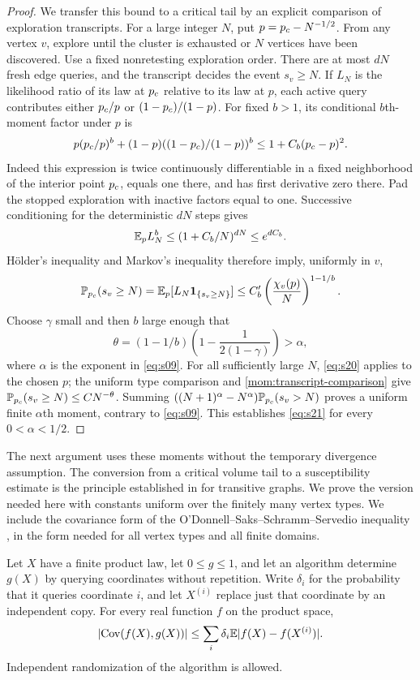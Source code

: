 \begin{proof}
We transfer this bound to a critical tail by an explicit comparison
of exploration transcripts.  For a large integer $N$, put
$p={p_c}-N^{-1/2}$.  From any vertex $v$, explore until the cluster
is exhausted or $N$ vertices have been discovered.  Use a fixed
nonretesting exploration order.  There are at most $dN$ fresh edge
queries, and the transcript decides the event $s_v\ge N$.
If $L_N$ is the likelihood ratio of its law at ${p_c}$ relative to
its law at $p$, each active query contributes either ${p_c}/p$ or
$(1-{p_c})/(1-p)$.  For fixed $b>1$, its conditional $b$th-moment
factor under $p$ is
\[
 p({p_c}/p)^b+(1-p)((1-{p_c})/(1-p))^b
       \le 1+C_b({p_c}-p)^2.
\]
Indeed this expression is twice continuously differentiable in a
fixed neighborhood of the interior point ${p_c}$, equals one there,
and has first derivative zero there.  Pad the stopped exploration
with inactive factors equal to one.  Successive conditioning for
the deterministic $dN$ steps gives
\[
 \mathbb E_p L_N^b\le(1+C_b/N)^{dN}\le e^{dC_b}.
\]
H\"older's inequality and Markov's inequality therefore imply,
uniformly in $v$,
\begin{equation}
 \mathbb P_{{p_c}}(s_v\ge N)
 =\mathbb E_p[L_N\mathbf 1_{\{s_v\ge N\}}]
 \le C_b'\left(\frac{\chi_v(p)}{N}\right)^{1-1/b}.
 \label{mom:transcript-comparison}
\end{equation}
Choose $\gamma$ small and then $b$ large enough that
\[
 \theta=(1-1/b)\left(1-\frac1{2(1-\gamma)}\right)>\alpha,
\]
where $\alpha$ is the exponent in \eqref{eq:s09}.  For all
sufficiently large $N$, \eqref{eq:s20} applies to the chosen $p$;
the uniform type comparison and
\eqref{mom:transcript-comparison} give
$\mathbb P_{{p_c}}(s_v\ge N)\le C N^{-\theta}$.
Summing
$((N+1)^\alpha-N^\alpha)\mathbb P_{{p_c}}(s_v>N)$ proves a uniform finite
$\alpha$th moment, contrary to \eqref{eq:s09}.  This establishes
\eqref{eq:s21} for every $0<\alpha<1/2$.
\end{proof}

The next argument uses these moments without the temporary
divergence assumption. The conversion from a critical volume tail to
a susceptibility estimate is the principle established in
\cite[Theorem~1.1]{Hutchcroft2020Exponents} for transitive graphs.
We prove the version needed here with constants uniform over the
finitely many vertex types. We include the covariance form of the
O'Donnell--Saks--Schramm--Servedio inequality
\cite[Section~3.3, Equation~(6)]{ODonnellSaksSchrammServedio2005},
in the form needed for all vertex types and all finite domains.

\begin{lemma}
\label{mom:decision-tree}
Let $X$ have a finite product law, let $0\le g\le1$, and let an
algorithm determine $g(X)$ by querying coordinates without
repetition.  Write $\delta_i$ for the probability that it queries
coordinate $i$, and let $X^{(i)}$ replace just that coordinate by an
independent copy.  For every real function $f$ on the product space,
\begin{equation}
 \lvert\operatorname{Cov}(f(X),g(X))\rvert
 \le\sum_i\delta_i\mathbb E\lvert f(X)-f(X^{(i)})\rvert.
 \label{mom:covariance}
\end{equation}
Independent randomization of the algorithm is allowed.
\end{lemma}


